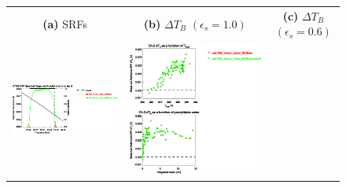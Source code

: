 \begin{figure}[H]
  \centering
  \begin{tabular}{c c c}
    \textsf{\textbf{(a)} SRFs} &
    \textsf{\textbf{(b)} $\Delta T_B$ $(\epsilon_s = 1.0)$} &
    \textsf{\textbf{(c)} $\Delta T_B$ $(\epsilon_s = 0.6)$} \\
    \includegraphics[bb=80 400 280 558,clip,scale=0.85]{graphics/srf/Rset/atms_npp.ch3.osrf.eps} &
    \includegraphics[bb=85 400 260 558,clip,scale=0.85]{graphics/dtb/Rset/e1.0_r0.0/atms_npp.ch3.dTb.eps} & 

\end{tabular}
\end{figure}
